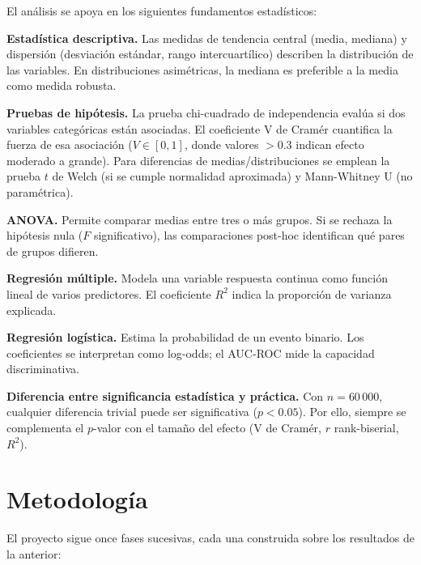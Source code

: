 \documentclass[11pt,a4paper]{article}
\begin{document}
El análisis se apoya en los siguientes fundamentos estadísticos:

\textbf{Estadística descriptiva.} Las medidas de tendencia central (media, mediana) y
dispersión (desviación estándar, rango intercuartílico) describen la distribución de las
variables. En distribuciones asimétricas, la mediana es preferible a la media como medida
robusta.

\textbf{Pruebas de hipótesis.} La prueba chi-cuadrado de independencia evalúa si dos
variables categóricas están asociadas. El coeficiente V de Cramér cuantifica la fuerza de
esa asociación ($V \in [0,1]$, donde valores $> 0.3$ indican efecto moderado a grande). Para
diferencias de medias/distribuciones se emplean la prueba $t$ de Welch (si se cumple
normalidad aproximada) y Mann-Whitney U (no paramétrica).

\textbf{ANOVA.} Permite comparar medias entre tres o más grupos. Si se rechaza la hipótesis
nula ($F$ significativo), las comparaciones post-hoc identifican qué pares de grupos
difieren.

\textbf{Regresión múltiple.} Modela una variable respuesta continua como función lineal de
varios predictores. El coeficiente $R^2$ indica la proporción de varianza explicada.

\textbf{Regresión logística.} Estima la probabilidad de un evento binario. Los coeficientes
se interpretan como log-odds; el AUC-ROC mide la capacidad discriminativa.

\textbf{Diferencia entre significancia estadística y práctica.} Con $n = 60\,000$, cualquier
diferencia trivial puede ser significativa ($p < 0.05$). Por ello, siempre se complementa
el $p$-valor con el tamaño del efecto (V de Cramér, $r$ rank-biserial, $R^2$).

\section{Metodología}

El proyecto sigue once fases sucesivas, cada una construida sobre los resultados de la
anterior:
\end{document}
